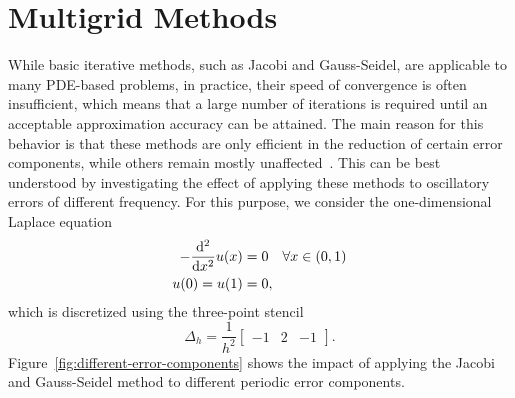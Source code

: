 \section{Multigrid Methods}\label{sec:multigrid-methods}
While basic iterative methods, such as Jacobi and Gauss-Seidel, are applicable to many PDE-based problems, in practice, their speed of convergence is often insufficient, which means that a large number of iterations is required until an acceptable approximation accuracy can be attained. 
The main reason for this behavior is that these methods are only efficient in the reduction of certain error components, while others remain mostly unaffected~\cite{briggs2000multigrid}.
This can be best understood by investigating the effect of applying these methods to oscillatory errors of different frequency.
For this purpose, we consider the one-dimensional Laplace equation
\begin{equation}
		\begin{split}
			- \dv[2]{x} u(x) & = 0 \quad \forall x \in (0, 1) \\
			u(0) = u(1) & = 0,
		\end{split}
		\label{eq:1D-laplace-model}
\end{equation}
which is discretized using the three-point stencil
\begin{equation}
	\Delta_h = \frac{1}{h^2}\begin{bmatrix}
		-1 & 2 & -1
	\end{bmatrix}.
		\label{eq:1D-laplace-stencil}
\end{equation} 
Figure~\ref{fig:different-error-components} shows the impact of applying the Jacobi and Gauss-Seidel method to different periodic error components.

